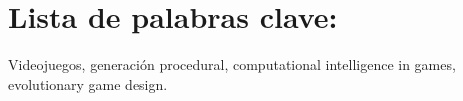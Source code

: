 %
%

\section*{Lista de palabras clave:}


Videojuegos, generación procedural, computational intelligence in games, evolutionary game design.
